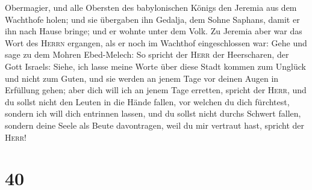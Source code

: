 Obermagier, und alle Obersten des babylonischen Königs den Jeremia aus
dem Wachthofe holen;  und sie übergaben ihn Gedalja, dem
Sohne Saphans, damit er ihn nach Hause bringe; und er wohnte unter dem
Volk.  Zu Jeremia aber war das Wort des \textsc{Herrn}
ergangen, als er noch im Wachthof eingeschlossen war: 
Gehe und sage zu dem Mohren Ebed-Melech: So spricht der \textsc{Herr}
der Heerscharen, der Gott Israels: Siehe, ich lasse meine Worte über
diese Stadt kommen zum Unglück und nicht zum Guten, und sie werden an
jenem Tage vor deinen Augen in Erfüllung gehen;  aber
dich will ich an jenem Tage erretten, spricht der \textsc{Herr}, und du
sollst nicht den Leuten in die Hände fallen, vor welchen du dich
fürchtest,  sondern ich will dich entrinnen lassen, und
du sollst nicht durchs Schwert fallen, sondern deine Seele als Beute
davontragen, weil du mir vertraut hast, spricht der \textsc{Herr}!

\hypertarget{section-39}{%
\section{40}\label{section-39}}

